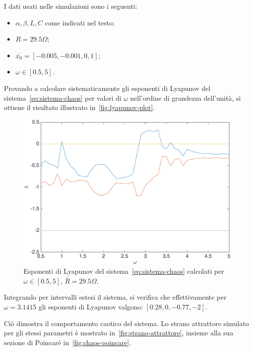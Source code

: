 I dati usati nelle simulazioni sono i seguenti:
\begin{itemize}
    \item $\alpha, \beta, L, C$ come indicati nel testo;
    \item $R=29.5 \Omega$;
    \item $\bar{x_0} = [-0.005, -0.001, 0, 1]$;
    \item $\omega \in [0.5, 5]$.
\end{itemize}

Provando a calcolare sistematicamente gli esponenti di Lyapunov del sistema~\ref{eq:sistema-chaos} per valori di $\omega$ nell'ordine di grandezza dell'unità, si ottiene il risultato illustrato in~\autoref{fig:lyapunov-plot}.

\begin{figure}
    \centering
    \includegraphics[width=\textwidth]{matcont/LyapunovPlot}
    \caption{Esponenti di Lyapunov del sistema~\ref{eq:sistema-chaos} calcolati per $\omega \in [0.5, 5]$, $\bar{R}=29.5 \Omega$.}
    \label{fig:lyapunov-plot}
\end{figure}

Integrando per intervalli estesi il sistema, si verifica che effettivamente per $\omega = 3.1415$ gli esponenti di Lyapunov valgono: $[0.28, 0, -0.77, -2]$.

Ciò dimostra il comportamento caotico del sistema. Lo strano attrattore simulato per gli stessi parametri è mostrato in~\autoref{fig:strano-attrattore}, insieme alla sua sezione di Poincaré in~\autoref{fig:chaos-poincare}.


